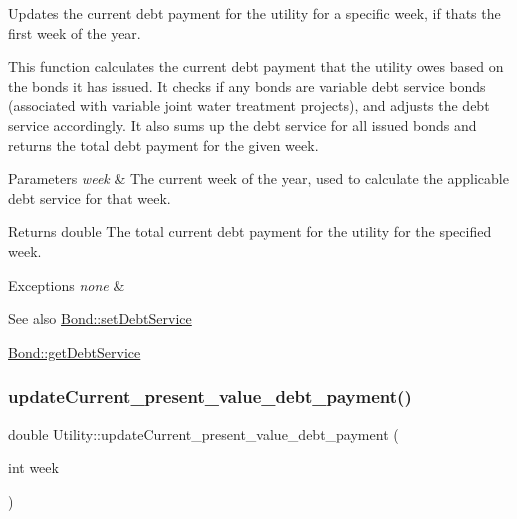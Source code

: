 Updates the current debt payment for the utility for a specific week, if that\textquotesingle{}s the first week of the year. 

This function calculates the current debt payment that the utility owes based on the bonds it has issued. It checks if any bonds are variable debt service bonds (associated with variable joint water treatment projects), and adjusts the debt service accordingly. It also sums up the debt service for all issued bonds and returns the total debt payment for the given week.


\begin{DoxyParams}{Parameters}
{\em week} & The current week of the year, used to calculate the applicable debt service for that week.\\
\hline
\end{DoxyParams}
\begin{DoxyReturn}{Returns}
double The total current debt payment for the utility for the specified week.
\end{DoxyReturn}

\begin{DoxyExceptions}{Exceptions}
{\em none} & \\
\hline
\end{DoxyExceptions}
\begin{DoxySeeAlso}{See also}
\mbox{\hyperlink{classBond_aff7fc4e1edcf199fb592d22c765b854e}{Bond\+::set\+Debt\+Service}} 

\mbox{\hyperlink{classBond_a98d8ecaf4b36319674ebd220598996bc}{Bond\+::get\+Debt\+Service}} 
\end{DoxySeeAlso}
\mbox{\label{classUtility_ab920387a318f7d7956da5e92582a58a3}} 
\subsubsection{\texorpdfstring{update\+Current\+\_\+present\+\_\+value\+\_\+debt\+\_\+payment()}{updateCurrent\_present\_value\_debt\_payment()}}
{\footnotesize\ttfamily double Utility\+::update\+Current\+\_\+present\+\_\+value\+\_\+debt\+\_\+payment (\begin{DoxyParamCaption}\item[{int}]{week }\end{DoxyParamCaption})}



